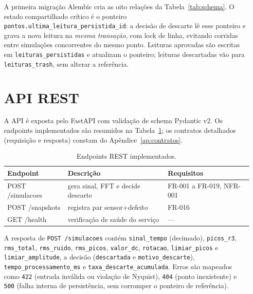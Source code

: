 A primeira migração Alembic cria as oito relações da
Tabela~\ref{tab:schema}. O estado compartilhado crítico é o ponteiro
\texttt{pontos.ultima\_leitura\_persistida\_id}: a decisão de descarte lê esse ponteiro
e grava a nova leitura na \emph{mesma transação}, com lock de linha, evitando
corridas entre simulações concorrentes do mesmo ponto. Leituras aprovadas são
escritas em \texttt{leituras\_persistidas} e atualizam o ponteiro; leituras descartadas
vão para \texttt{leituras\_trash}, sem alterar a referência.

\section{API REST}

A API é exposta pelo FastAPI com validação de schema Pydantic v2. Os endpoints
implementados são resumidos na Tabela~\ref{tab:endpoints}; os contratos
detalhados (requisição e resposta) constam do Apêndice~\ref{ap:contratos}.

\begin{table}[htbp]
\centering
\caption{Endpoints REST implementados.}
\label{tab:endpoints}
\begin{tabular}{@{}p{4.6cm}p{4.4cm}p{4cm}@{}}
\toprule
\textbf{Endpoint} & \textbf{Descrição} & \textbf{Requisitos} \\
\midrule
POST /simulacoes & gera sinal, FFT e decide descarte & FR-001 a FR-019, NFR-001 \\
POST /snapshots & registra par sensor+defeito & FR-016 \\
GET /health & verificação de saúde do serviço & --- \\
\bottomrule
\end{tabular}
\par{}
\end{table}

A resposta de \texttt{POST /simulacoes} contém \texttt{sinal\_tempo} (decimado), \texttt{picos\_r3},
\texttt{rms\_total}, \texttt{rms\_ruido}, \texttt{rms\_picos}, \texttt{valor\_dc}, \texttt{rotacao}, \texttt{limiar\_picos} e
\texttt{limiar\_amplitude}, a decisão (\texttt{descartada} e \texttt{motivo\_descarte}),
\texttt{tempo\_processamento\_ms} e \texttt{taxa\_descarte\_acumulada}. Erros são mapeados como
\texttt{422} (entrada inválida ou violação de Nyquist), \texttt{404} (ponto inexistente) e
\texttt{500} (falha interna de persistência, sem corromper o ponteiro de referência).

